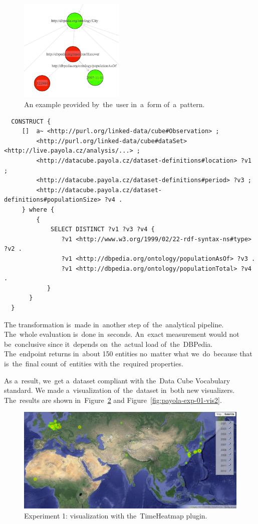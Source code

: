 \begin{figure}
  \centering
  \includegraphics[width=50mm]{img/payola-exp-01-selection.png}
  \caption{An example provided by~the~user in~a~form of~a~pattern.}
  \label{fig:payola-exp-01-selection}
\end{figure}

\scriptsize
\begin{verbatim}
  CONSTRUCT {
     []  a~ <http://purl.org/linked-data/cube#Observation> ;
         <http://purl.org/linked-data/cube#dataSet> <http://live.payola.cz/analysis/...> ;
         <http://datacube.payola.cz/dataset-definitions#location> ?v1 ;
         <http://datacube.payola.cz/dataset-definitions#period> ?v3 ;
         <http://datacube.payola.cz/dataset-definitions#populationSize> ?v4 .
     } where {
         {
             SELECT DISTINCT ?v1 ?v3 ?v4 {
                ?v1 <http://www.w3.org/1999/02/22-rdf-syntax-ns#type> ?v2 .
                ?v1 <http://dbpedia.org/ontology/populationAsOf> ?v3 .
                ?v1 <http://dbpedia.org/ontology/populationTotal> ?v4 .
            }
       }
  } 
\end{verbatim}
\normalsize

The transformation is~made in~another step of~the~analytical pipeline. The~whole evaluation is~done in~seconds. An~exact measurement would not be~conclusive since it~depends on~the~actual load of~the~DBPedia. The~endpoint 
returns in~about 150 entities no~matter what we~do~because that is~the~final
count of~entities with the~required properties.

As a~result, we~get a~dataset compliant with the~Data Cube Vocabulary standard. 
We made a~visualization of~the~dataset in~both new visualizers. The~results are 
shown in~Figure~\ref{fig:payola-exp-01-vis} and Figure~\ref{fig:payola-exp-01-vis2}.

\begin{figure}
  \centering
  \includegraphics[width=140mm]{img/payola-exp-01-vis.png}
  \caption{Experiment 1: visualization with the~TimeHeatmap plugin.}
  \label{fig:payola-exp-01-vis}
\end{figure}

